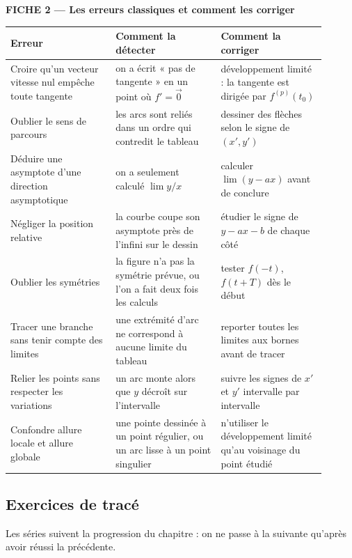 \documentclass[a4paper,11pt]{article}
\numberwithin{equation}{section}
\numberwithin{figure}{section}
\numberwithin{table}{section}
\theoremstyle{enonce}
\theoremstyle{exemple}
\theoremstyle{remarque}
\newcommand{\ve}[1]{\vec{#1}}
\begin{document}
\begin{tcolorbox}[enhanced,breakable,colback=white,colframe=white,arc=0pt,boxrule=0pt,left=4pt,right=4pt,top=10pt,bottom=6pt,
  borderline north={1.4pt}{0pt}{Brique}]
\label{fiche:2}{\sffamily\bfseries\color{Brique}FICHE 2 --- Les erreurs classiques et comment les corriger}\par\medskip
\small
\renewcommand{\arraystretch}{1.3}
\begin{tabular}{>{\raggedright}p{0.3\linewidth}>{\raggedright}p{0.3\linewidth}p{0.3\linewidth}}
\toprule
\sffamily Erreur & \sffamily Comment la détecter & \sffamily Comment la corriger\\\midrule
Croire qu'un vecteur vitesse nul empêche toute tangente & on a écrit « pas de tangente » en un point où $f'=\ve0$ & développement limité : la tangente est dirigée par $f^{(p)}(t_0)$\tabularnewline
Oublier le sens de parcours & les arcs sont reliés dans un ordre qui contredit le tableau & dessiner des flèches selon le signe de $(x',y')$\tabularnewline
Déduire une asymptote d'une direction asymptotique & on a seulement calculé $\lim y/x$ & calculer $\lim(y-ax)$ avant de conclure\tabularnewline
Négliger la position relative & la courbe coupe son asymptote près de l'infini sur le dessin & étudier le signe de $y-ax-b$ de chaque côté\tabularnewline
Oublier les symétries & la figure n'a pas la symétrie prévue, ou l'on a fait deux fois les calculs & tester $f(-t)$, $f(t+T)$ dès le début\tabularnewline
Tracer une branche sans tenir compte des limites & une extrémité d'arc ne correspond à aucune limite du tableau & reporter toutes les limites aux bornes avant de tracer\tabularnewline
Relier les points sans respecter les variations & un arc monte alors que $y$ décroît sur l'intervalle & suivre les signes de $x'$ et $y'$ intervalle par intervalle\tabularnewline
Confondre allure locale et allure globale & une pointe dessinée à un point régulier, ou un arc lisse à un point singulier & n'utiliser le développement limité qu'au voisinage du point étudié\tabularnewline
\bottomrule
\end{tabular}
\end{tcolorbox}

\subsection{Exercices de tracé}

Les séries suivent la progression du chapitre : on ne passe à la suivante qu'après avoir réussi la précédente.
\end{document}
